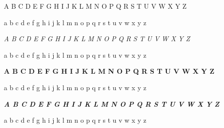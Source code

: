 \documentclass[12pt,a4paper]{article}
\begin{document}
\normalfont
A B C D E F G H I J K L M N O P Q R S T U V W X Y Z

a b c d e f g h i j k l m n o p q r s t u v w x y z

\itshape
A B C D E F G H I J K L M N O P Q R S T U V W X Y Z

a b c d e f g h i j k l m n o p q r s t u v w x y z

\bfseries
A B C D E F G H I J K L M N O P Q R S T U V W X Y Z

a b c d e f g h i j k l m n o p q r s t u v w x y z

\bfseries\itshape
A B C D E F G H I J K L M N O P Q R S T U V W X Y Z

a b c d e f g h i j k l m n o p q r s t u v w x y z
% 
%
\end{document}

